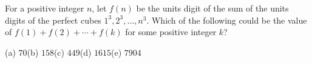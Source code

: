 For a positive integer $n$, let $f(n)$ be the units digit of the sum of the units digits of the perfect cubes $1^3,2^3,\dots,n^3$. Which of the following could be the value of $f(1)+f(2)+\cdots+f(k)$ for some positive integer $k$?

(a) $70$\quad (b) $158$\quad (c) $449$\quad (d) $1615$\quad (e) $7904$
